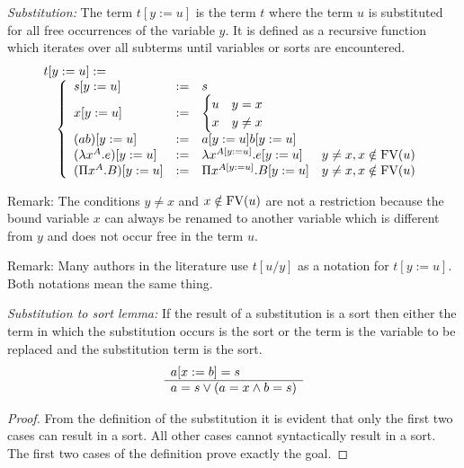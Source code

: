 \begin{definition}
    \emph{Substitution:}
    The term $t[y:=u]$ is the term $t$ where the term $u$ is substituted for all
    free occurrences of the variable $y$. It is defined as a recursive function
    which iterates over all subterms until variables or sorts are encountered.
    $$
    \begin{array}{l}
        t[y:=u] :=
        \\
        \quad\left\{ \begin{array}{llll} 
            s[y:=u] &:=& s
            \\
            x[y:=u] &:=&
                \begin{cases}
                    u & y = x
                    \\
                    x & y \ne x
                \end{cases}
            \\
            (a b)[y:=u] &:=& a[y:=u] b[y:=u]
            \\
            (\lambda x^A . e)[y:=u]
            &:=&
            \lambda x^{A[y:=u]}.e[y:=u]
            & y \ne x, x \notin \text{FV}(u)
            \\
            (\Pi x^A . B)[y:=u]
            &:=&
            \Pi x^{A[y:=u]}. B[y:=u]
            & y \ne x, x \notin \text{FV}(u)
         \end{array} \right.
    \end{array}
    $$
\end{definition}

Remark:
        The conditions $y \ne x$ and $x \notin \text{FV}(u)$ are not a restriction
        because the bound variable $x$ can always be renamed to another
        variable which is different from $y$ and does not occur free in the term
        $u$.

Remark:
        Many authors in the literature use $t[u/y]$ as a notation for $t[y:=u]$.
        Both notations mean the same thing.


\begin{lemma}
    \label{SubstitutionToSort}
    \emph{Substitution to sort lemma:}
    If the result of a substitution is a sort then either the term in
    which the substitution occurs is the sort or the term is the variable to be
    replaced and the substitution term is the sort.
    $$
        \begin{array}{l} 
            a[x:=b] = s
         \\ \hline 
            a = s \lor (a = x \land b = s)
        \end{array}
    $$
    \begin{proof}
        From the definition of the substitution it is evident that only the
        first two cases can result in a sort. All other cases cannot
        syntactically result in a sort. The first two cases of the definition
        prove exactly the goal.
    \end{proof}
\end{lemma}


